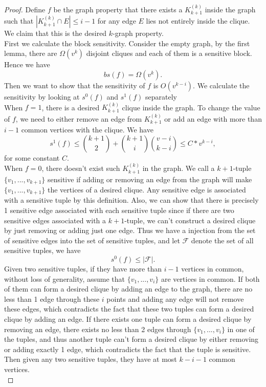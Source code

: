 \documentclass[psamsfonts]{amsart}
\theoremstyle{definition}
\theoremstyle{remark}
\numberwithin{equation}{section}
\begin{document}
	\begin{proof}
		Define $f$ be the graph property that there exists a $K_{k+1}^{(k)}$ inside the graph such that $|K_{k+1}^{(k)} \cap E| \leq  i-1$ for any edge $E$ lies not entirely inside the clique. We claim that this is the desired $k$-graph property.\\
		\indent First we calculate the block sensitivity. Consider the empty graph, by the first lemma, there are $\Omega (v^k)$ disjoint cliques and each of them is a sensitive block. Hence we have 
		\begin{equation}
			bs(f) = \Omega (v^k).
		\end{equation}
		\indent Then we want to show that the sensitivity of $f$ is $O(v^{k-i})$. We calculate the sensitivity by looking at $s^0(f)$ and $s^1(f)$ separately\\
		\indent When $f=1$, there is a desired $K_{k+1}^{(k)}$ clique inside the graph. To change the value of $f$, we need to either remove an edge from $K_{k+1}^{(k)}$ or add an edge with more than $i-1$ common vertices with the clique. We have
		\begin{equation}
			s^1(f) \leq {k+1 \choose{2}}+{k+1 \choose{i}}{v-i \choose{k-i}} \leq C*v^{k-i},
		\end{equation}
		for some constant $C$.\\
		\indent When $f=0$, there doesn't exist such $K_{k+1}^{(k)}$ in the graph. We call a $k+1$-tuple $\{v_1,...,v_{k+1}\}$ sensitive if adding or removing an edge from the graph will make $\{v_1,...,v_{k+1}\}$ the vertices of a desired clique. Any sensitive edge is associated with a sensitive tuple by this definition. Also, we can show that there is precisely 1 sensitive edge associated with each sensitive tuple since if there are two sensitive edges associated with a $k+1$-tuple, we can't construct a desired clique by just removing or adding just one edge. Thus we have a injection from the set of sensitive edges into the set of sensitive tuples, and let $\mathcal{F}$ denote the set of all sensitive tuples, we have
		\begin{equation}
			s^0(f) \leq |\mathcal{F}|.
		\end{equation}
		\indent Given two sensitive tuples, if they have more than $i-1$ vertices in common, without loss of generality, assume that $\{v_1,...,v_i\}$ are vertices in common. If both of them can form a desired clique by adding an edge to the graph, there are no less than 1 edge through these $i$ points and adding any edge will not remove these edges, which contradicts the fact that these two tuples can form a desired clique by adding an edge. If there exists one tuple can form a desired clique by removing an edge, there exists no less than 2 edges through $\{v_1,...,v_i\}$ in one of the tuples, and thus another tuple can't form a desired clique by either removing or adding exactly 1 edge, which contradicts the fact that the tuple is sensitive. Then given any two sensitive tuples, they have at most $k-i-1$ common vertices.\\

\end{proof}
\end{document}
